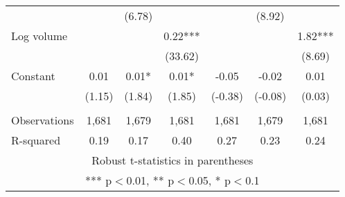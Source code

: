 \documentclass[]{article}
\begin{document}
\begin{tabular}{lcccccc}
 &  & (6.78) &  &  & (8.92) &  \\
Log volume &  &  & 0.22*** &  &  & 1.82*** \\
 &  &  & (33.62) &  &  & (8.69) \\
Constant & 0.01 & 0.01* & 0.01* & -0.05 & -0.02 & 0.01 \\
 & (1.15) & (1.84) & (1.85) & (-0.38) & (-0.08) & (0.03) \\
 &  &  &  &  &  &  \\
Observations & 1,681 & 1,679 & 1,681 & 1,681 & 1,679 & 1,681 \\
 R-squared & 0.19 & 0.17 & 0.40 & 0.27 & 0.23 & 0.24 \\ \hline
\multicolumn{7}{c}{ Robust t-statistics in parentheses} \\
\multicolumn{7}{c}{ *** p$<$0.01, ** p$<$0.05, * p$<$0.1} \\
\end{tabular}
\end{document}
